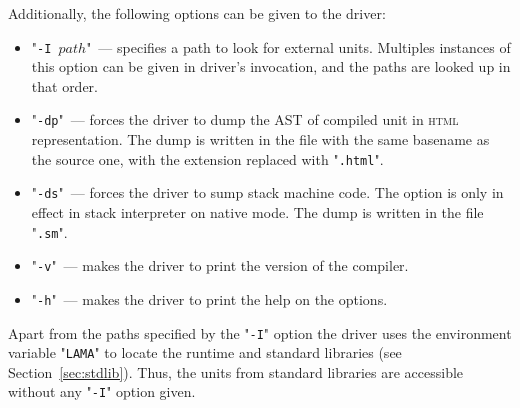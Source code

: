 Additionally, the following options can be given to the driver:

\begin{itemize}
\item "\texttt{-I $path$}"~--- specifies a path to look for external units. Multiples instances of this option can be given in driver's
  invocation, and the paths are looked up in that order.
\item "\texttt{-dp}"~--- forces the driver to dump the AST of compiled unit in \textsc{html} representation. The dump is written in the file with the same
  basename as the source one, with the extension replaced with "\texttt{.html}".
\item "\texttt{-ds}"~--- forces the driver to sump stack machine code. The option is only in effect in stack interpreter on
  native mode. The dump is written in the file "\texttt{.sm}".
\item "\texttt{-v}"~--- makes the driver to print the version of the compiler.
\item "\texttt{-h}"~--- makes the driver to print the help on the options.
\end{itemize}

Apart from the paths specified by the "\texttt{-I}" option the driver uses the environment variable "\texttt{LAMA}"
to locate the runtime and standard libraries (see Section~\ref{sec:stdlib}). Thus, the units from standard libraries are accessible
without any "\texttt{-I}" option given.
